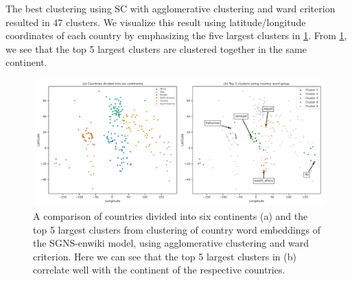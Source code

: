 The best clustering using SC with agglomerative clustering and ward criterion resulted in 47 clusters. We visualize this result using latitude/longitude coordinates of each country by emphasizing the five largest clusters in \cref{fig:cluster-analysis-agglomerative-country-word-group-top-clusters}. From \cref{fig:cluster-analysis-agglomerative-country-word-group-top-clusters}, we see that the top 5 largest clusters are clustered together in the same continent.
\begin{figure}[H]
    \centering
    \includegraphics[width=\textwidth]{thesis/figures/cluster-analysis-agglomerative-country-word-group-top-clusters.pdf}
    \caption{A comparison of countries divided into six continents (a) and the top 5 largest clusters from clustering of country word embeddings of the SGNS-enwiki model, using agglomerative clustering and ward criterion. Here we can see that the top 5 largest clusters in (b) correlate well with the continent of the respective countries.}
    \label{fig:cluster-analysis-agglomerative-country-word-group-top-clusters}
\end{figure}

